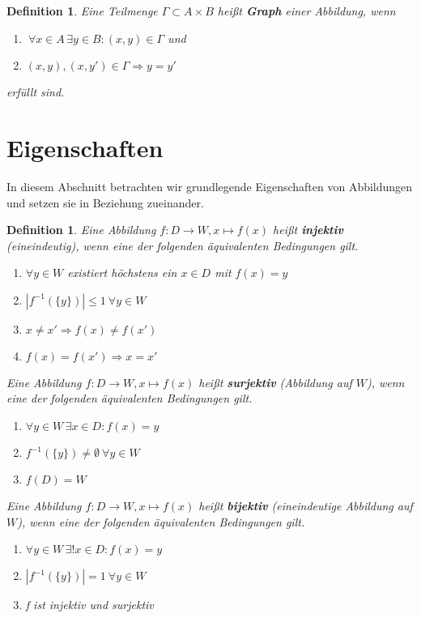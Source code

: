\documentclass{article}
\newtheorem{definition}[lemma]{Definition}
\numberwithin{lemma}{section}
\newcommand{\foral}{ \ \forall }
\begin{document}
\begin{definition}
Eine Teilmenge $\Gamma \subset A \times B$ heißt \textbf{Graph} einer Abbildung, wenn
\begin{enumerate}[label={\alph*)}]
\item $\foral x \in A \, \exists y \in B : (x,y) \in \Gamma$ und
\item $(x,y),(x,y')\in\Gamma \Rightarrow y = y'$
\end{enumerate}
erfüllt sind.
\end{definition}

\section{Eigenschaften}

In diesem Abschnitt betrachten wir grundlegende Eigenschaften von Abbildungen und setzen sie in Beziehung zueinander.

\begin{definition}
Eine Abbildung $f: D \to W, x \mapsto f(x)$ heißt \textbf{injektiv} (eineindeutig), wenn eine der folgenden äquivalenten Bedingungen gilt.
\begin{enumerate}
\item $\forall y \in W$ existiert höchstens ein $x \in D$ mit $f(x)=y$
\item $|f^{-1}(\{y\})| \leq 1 \foral y \in W$
\item $x \neq x' \Rightarrow f(x) \neq f(x')$
\item $f(x) = f(x') \Rightarrow x = x'$
\end{enumerate}
Eine Abbildung $f: D \to W, x \mapsto f(x)$ heißt \textbf{surjektiv} (Abbildung auf $W$), wenn eine der folgenden äquivalenten Bedingungen gilt.
\begin{enumerate}
\item $\forall y \in W \, \exists x \in D : f(x)=y$
\item $f^{-1}(\{y\}) \neq \emptyset \foral y \in W$
\item $f(D) = W$
\end{enumerate}
Eine Abbildung $f: D \to W, x \mapsto f(x)$ heißt \textbf{bijektiv} (eineindeutige Abbildung auf $W$), wenn eine der folgenden äquivalenten Bedingungen gilt.
\begin{enumerate}
\item $\forall y \in W \, \exists ! x \in D : f(x)=y$
\item $|f^{-1}(\{y\})| = 1 \foral y \in W$
\item f ist injektiv und surjektiv
\end{enumerate}
\end{definition}
\end{document}
